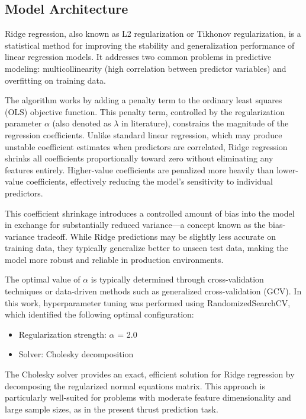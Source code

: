 \documentclass[12pt,a4paper]{article}
\begin{document}
\subsection{Model Architecture}

Ridge regression, also known as L2 regularization or Tikhonov regularization, is a statistical method for improving the stability and generalization performance of linear regression models. It addresses two common problems in predictive modeling: multicollinearity (high correlation between predictor variables) and overfitting on training data.

The algorithm works by adding a penalty term to the ordinary least squares (OLS) objective function. This penalty term, controlled by the regularization parameter $\alpha$ (also denoted as $\lambda$ in literature), constrains the magnitude of the regression coefficients. Unlike standard linear regression, which may produce unstable coefficient estimates when predictors are correlated, Ridge regression shrinks all coefficients proportionally toward zero without eliminating any features entirely. Higher-value coefficients are penalized more heavily than lower-value coefficients, effectively reducing the model's sensitivity to individual predictors.

This coefficient shrinkage introduces a controlled amount of bias into the model in exchange for substantially reduced variance—a concept known as the bias-variance tradeoff. While Ridge predictions may be slightly less accurate on training data, they typically generalize better to unseen test data, making the model more robust and reliable in production environments.

The optimal value of $\alpha$ is typically determined through cross-validation techniques or data-driven methods such as generalized cross-validation (GCV). In this work, hyperparameter tuning was performed using RandomizedSearchCV, which identified the following optimal configuration:

\begin{itemize}
    \item Regularization strength: $\alpha$ = 2.0
    \item Solver: Cholesky decomposition
\end{itemize}

The Cholesky solver provides an exact, efficient solution for Ridge regression by decomposing the regularized normal equations matrix. This approach is particularly well-suited for problems with moderate feature dimensionality and large sample sizes, as in the present thrust prediction task.
\end{document}
